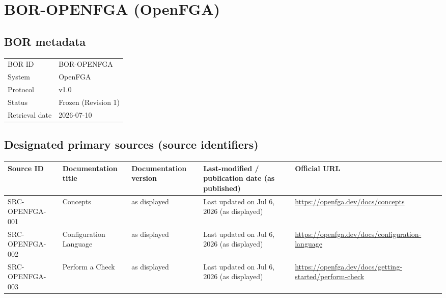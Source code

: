 \documentclass[11pt]{article}
\begin{document}
\section*{BOR-OPENFGA (OpenFGA)}
\subsection*{BOR metadata}
\begin{tabular}{@{}L{2.2in}L{4.2in}@{}}
\toprule
BOR ID & BOR-OPENFGA\\
System & OpenFGA\\
Protocol & v1.0\\
Status & Frozen (Revision 1)\\
Retrieval date & 2026-07-10\\
\bottomrule
\end{tabular}

\subsection*{Designated primary sources (source identifiers)}
\begin{longtable}{@{}L{1.6in}L{2.9in}L{1.0in}L{0.9in}L{1.9in}@{}}
\toprule
Source ID & Documentation title & Documentation version & Last-modified / publication date (as published) & Official URL\\
\midrule
\endhead
SRC-OPENFGA-001 & Concepts & as displayed & Last updated on Jul 6, 2026 (as displayed) & \url{https://openfga.dev/docs/concepts}\\
SRC-OPENFGA-002 & Configuration Language & as displayed & Last updated on Jul 6, 2026 (as displayed) & \url{https://openfga.dev/docs/configuration-language}\\
SRC-OPENFGA-003 & Perform a Check & as displayed & Last updated on Jul 6, 2026 (as displayed) & \url{https://openfga.dev/docs/getting-started/perform-check}\\
\bottomrule
\end{longtable}
\end{document}
